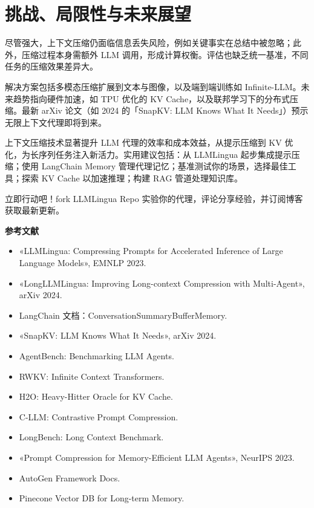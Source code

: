 \chapter{挑战、局限性与未来展望}
尽管强大，上下文压缩仍面临信息丢失风险，例如关键事实在总结中被忽略；此外，压缩过程本身需额外 LLM 调用，形成计算权衡。评估也缺乏统一基准，不同任务的压缩效果差异大。\par
解决方案包括多模态压缩扩展到文本与图像，以及端到端训练如 Infinite-LLM。未来趋势指向硬件加速，如 TPU 优化的 KV Cache，以及联邦学习下的分布式压缩。最新 arXiv 论文（如 2024 的「SnapKV: LLM Knows What It Needs」）预示无限上下文代理即将到来。\par
上下文压缩技术显著提升 LLM 代理的效率和成本效益，从提示压缩到 KV 优化，为长序列任务注入新活力。实用建议包括：从 LLMLingua 起步集成提示压缩；使用 LangChain Memory 管理代理记忆；基准测试你的场景，选择最佳工具；探索 KV Cache 以加速推理；构建 RAG 管道处理知识库。\par
立即行动吧！fork LLMLingua Repo 实验你的代理，评论分享经验，并订阅博客获取最新更新。\par
\textbf{参考文献}\par
\begin{itemize}
\item «LLMLingua: Compressing Prompts for Accelerated Inference of Large Language Models», EMNLP 2023.
\item «LongLLMLingua: Improving Long-context Compression with Multi-Agent», arXiv 2024.
\item LangChain 文档：ConversationSummaryBufferMemory.
\item «SnapKV: LLM Knows What It Needs», arXiv 2024.
\item AgentBench: Benchmarking LLM Agents.
\item RWKV: Infinite Context Transformers.
\item H2O: Heavy-Hitter Oracle for KV Cache.
\item C-LLM: Contrastive Prompt Compression.
\item LongBench: Long Context Benchmark.
\item «Prompt Compression for Memory-Efficient LLM Agents», NeurIPS 2023.
\item AutoGen Framework Docs.
\item Pinecone Vector DB for Long-term Memory.
\end{itemize}
